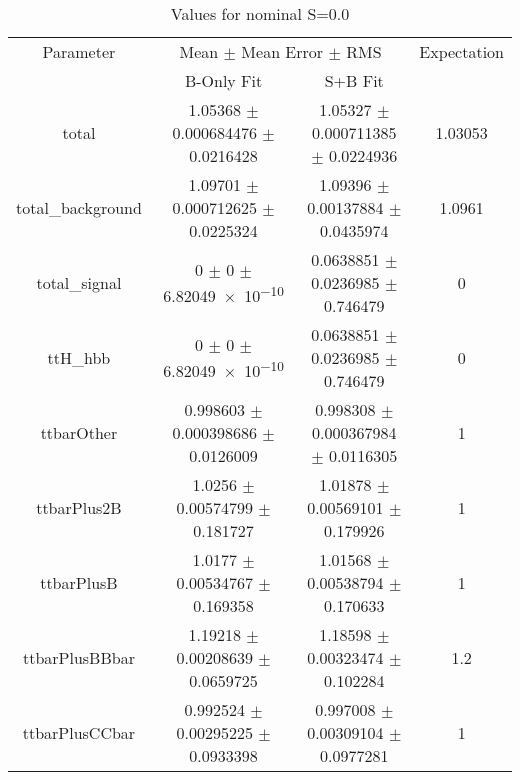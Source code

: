 \begin{table}
\centering
\caption{Values for nominal S=0.0}
\begin{tabular}{cccc}
\toprule
Parameter & \multicolumn{2}{c}{Mean $\pm$ Mean Error $\pm$ RMS} & Expectation\\
 & B-Only Fit & S+B Fit & \\
\midrule
total & \num{1.05368} $\pm$ \num{0.000684476} $\pm$ \num{0.0216428} & \num{1.05327} $\pm$ \num{0.000711385} $\pm$ \num{0.0224936} & \num{1.03053}\\
total\_background & \num{1.09701} $\pm$ \num{0.000712625} $\pm$ \num{0.0225324} & \num{1.09396} $\pm$ \num{0.00137884} $\pm$ \num{0.0435974} & \num{1.0961}\\
total\_signal & \num{0} $\pm$ \num{0} $\pm$ \num{6.82049e-10} & \num{0.0638851} $\pm$ \num{0.0236985} $\pm$ \num{0.746479} & \num{0}\\
ttH\_hbb & \num{0} $\pm$ \num{0} $\pm$ \num{6.82049e-10} & \num{0.0638851} $\pm$ \num{0.0236985} $\pm$ \num{0.746479} & \num{0}\\
ttbarOther & \num{0.998603} $\pm$ \num{0.000398686} $\pm$ \num{0.0126009} & \num{0.998308} $\pm$ \num{0.000367984} $\pm$ \num{0.0116305} & \num{1}\\
ttbarPlus2B & \num{1.0256} $\pm$ \num{0.00574799} $\pm$ \num{0.181727} & \num{1.01878} $\pm$ \num{0.00569101} $\pm$ \num{0.179926} & \num{1}\\
ttbarPlusB & \num{1.0177} $\pm$ \num{0.00534767} $\pm$ \num{0.169358} & \num{1.01568} $\pm$ \num{0.00538794} $\pm$ \num{0.170633} & \num{1}\\
ttbarPlusBBbar & \num{1.19218} $\pm$ \num{0.00208639} $\pm$ \num{0.0659725} & \num{1.18598} $\pm$ \num{0.00323474} $\pm$ \num{0.102284} & \num{1.2}\\
ttbarPlusCCbar & \num{0.992524} $\pm$ \num{0.00295225} $\pm$ \num{0.0933398} & \num{0.997008} $\pm$ \num{0.00309104} $\pm$ \num{0.0977281} & \num{1}\\
\bottomrule
\end{tabular}
\end{table}